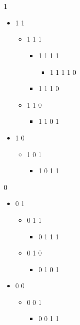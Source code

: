 \\\\
1 


\begin{itemize}
\item 1 1 


\begin{itemize}
\item 1 1 1 


\begin{itemize}
\item 1 1 1 1 


\begin{itemize}
\item 1 1 1 1 0
\end{itemize}
\item 1 1 1 0
\end{itemize}
\item 1 1 0 


\begin{itemize}
\item 1 1 0 1
\end{itemize}
\end{itemize}
\item 1 0 


\begin{itemize}
\item 1 0 1 


\begin{itemize}
\item 1 0 1 1
\end{itemize}
\end{itemize}
\end{itemize}
0 


\begin{itemize}
\item 0 1 


\begin{itemize}
\item 0 1 1 


\begin{itemize}
\item 0 1 1 1
\end{itemize}
\item 0 1 0 


\begin{itemize}
\item 0 1 0 1
\end{itemize}
\end{itemize}
\item 0 0 


\begin{itemize}
\item 0 0 1 


\begin{itemize}
\item 0 0 1 1
\end{itemize}
\end{itemize}
\end{itemize}

